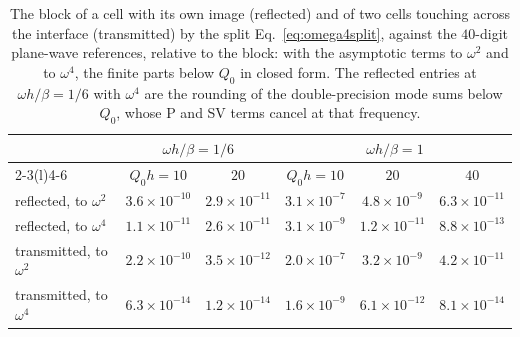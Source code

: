 \documentclass[11pt,a4paper]{article}
\begin{document}
\begin{table}[h]
\centering
\small
\begin{tabular}{lccccc}
\toprule
 & \multicolumn{2}{c}{$\omega h/\beta=1/6$} & \multicolumn{3}{c}{$\omega h/\beta=1$} \\
\cmidrule(lr){2-3}\cmidrule(l){4-6}
 & $Q_0h=10$ & $20$ & $Q_0h=10$ & $20$ & $40$ \\
\midrule
reflected, to $\omega^2$   & $3.6\times10^{-10}$ & $2.9\times10^{-11}$ & $3.1\times10^{-7}$ & $4.8\times10^{-9}$ & $6.3\times10^{-11}$ \\
reflected, to $\omega^4$   & $1.1\times10^{-11}$ & $2.6\times10^{-11}$ & $3.1\times10^{-9}$ & $1.2\times10^{-11}$ & $8.8\times10^{-13}$ \\
transmitted, to $\omega^2$ & $2.2\times10^{-10}$ & $3.5\times10^{-12}$ & $2.0\times10^{-7}$ & $3.2\times10^{-9}$ & $4.2\times10^{-11}$ \\
transmitted, to $\omega^4$ & $6.3\times10^{-14}$ & $1.2\times10^{-14}$ & $1.6\times10^{-9}$ & $6.1\times10^{-12}$ & $8.1\times10^{-14}$ \\
\bottomrule
\end{tabular}
\caption{The block of a cell with its own image (reflected) and of two cells touching across the interface
(transmitted) by the split Eq.~\eqref{eq:omega4split}, against the $40$-digit plane-wave references, relative to
the block: with the asymptotic terms to $\omega^2$ and to $\omega^4$, the finite parts below $Q_0$ in closed form.
The reflected entries at $\omega h/\beta=1/6$ with $\omega^4$ are the rounding of the double-precision mode sums
below $Q_0$, whose P and SV terms cancel at that frequency.}
\label{tab:omega4}
\end{table}
\end{document}

